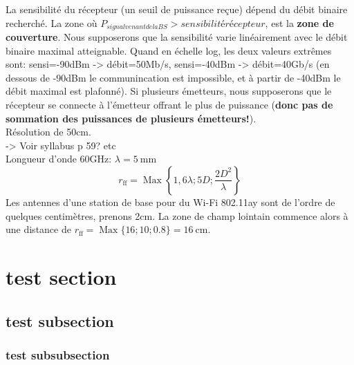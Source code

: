 La sensibilité du récepteur (un seuil de puissance reçue) dépend du débit binaire recherché. La zone où $P_{signal venant de la BS} > sensibilité récepteur$, est la \textbf{zone de couverture}. Nous supposerons que la sensibilité varie linéairement avec le débit binaire maximal atteignable. Quand en échelle log, les deux valeurs extrêmes sont: sensi=-90dBm -> débit=50Mb/s, sensi=-40dBm -> débit=40Gb/s (en dessous de -90dBm le communincation est impossible, et à partir de -40dBm le débit maximal est plafonné). Si plusieurs émetteurs, nous supposerons que le récepteur se connecte à l'émetteur offrant le plus de puissance (\textbf{donc pas de sommation des puissances de plusieurs émetteurs!}).\\

Résolution de 50cm.\\


-> Voir syllabus p 59? etc\\

Longueur d'onde 60GHz: $\lambda=5 \mathrm{~mm}$\\

$$
r_{\mathrm{ff}}=\operatorname{Max}\left\{1,6 \lambda ; 5 D ; \frac{2 D^2}{\lambda}\right\}
$$
Les antennes d'une station de base pour du Wi-Fi 802.11ay sont de l'ordre de quelques centimètres, prenons 2cm. La zone de champ lointain commence alors à une distance de $r_{\mathrm{ff}}= \operatorname{Max}\{16 ; 10 ; 0.8\} = 16\mathrm{~cm}$. 

\section{test section}
\subsection{test subsection}
\subsubsection{test subsubsection}
